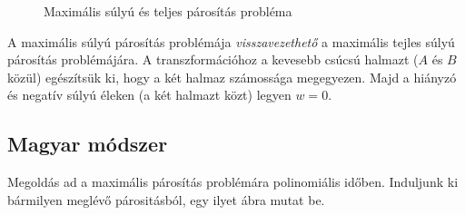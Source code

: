 \begin{figure}[htb]
\caption{Maximális súlyú és teljes párosítás probléma}
\label{fig:OptMaxNemEkv}
\centering
{} 
\end{figure}

A maximális súlyú párosítás problémája \emph{visszavezethető} a maximális tejles
súlyú párosítás problémájára. A transzformációhoz a kevesebb csúcsú halmazt ($A$
és $B$ közül) egészítsük ki, hogy a két halmaz számossága megegyezen. Majd a
hiányzó és negatív súlyú éleken (a két halmazt közt) legyen $w=0$. 

\subsection{Magyar módszer}

Megoldás ad a maximális párosítás problémára polinomiális időben. Induljunk ki
bármilyen meglévő párositásból, egy ilyet  ábra
mutat be.


